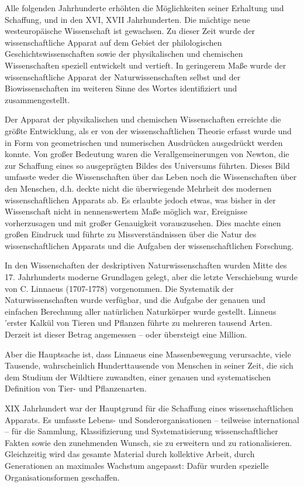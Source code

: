 \documentclass[11pt,a4paper]{book}
\begin{document}
Alle folgenden Jahrhunderte erhöhten die Möglichkeiten seiner Erhaltung und Schaffung, und in den XVI, XVII Jahrhunderten. Die mächtige neue westeuropäische Wissenschaft ist gewachsen. Zu dieser Zeit wurde der wissenschaftliche Apparat auf dem Gebiet der philologischen Geschichtswissenschaften sowie der physikalischen und chemischen Wissenschaften speziell entwickelt und vertieft. In geringerem Maße wurde der wissenschaftliche Apparat der Naturwissenschaften selbst und der Biowissenschaften im weiteren Sinne des Wortes identifiziert und zusammengestellt.



Der Apparat der physikalischen und chemischen Wissenschaften erreichte die größte Entwicklung, als er von der wissenschaftlichen Theorie erfasst wurde und in Form von geometrischen und numerischen Ausdrücken ausgedrückt werden konnte. Von großer Bedeutung waren die Verallgemeinerungen von Newton, die zur Schaffung eines so ausgeprägten Bildes des Universums führten. Dieses Bild umfasste weder die Wissenschaften über das Leben noch die Wissenschaften über den Menschen, d.h. deckte nicht die überwiegende Mehrheit des modernen wissenschaftlichen Apparats ab. Es erlaubte jedoch etwas, was bisher in der Wissenschaft nicht in nennenswertem Maße möglich war, Ereignisse vorherzusagen und mit großer Genauigkeit vorauszusehen. Dies machte einen großen Eindruck und führte zu Missverständnissen über die Natur des wissenschaftlichen Apparats und die Aufgaben der wissenschaftlichen Forschung.



In den Wissenschaften der deskriptiven Naturwissenschaften wurden Mitte des 17. Jahrhunderts moderne Grundlagen gelegt, aber die letzte Verschiebung wurde von C. Linnaeus (1707-1778) vorgenommen. Die Systematik der Naturwissenschaften wurde verfügbar, und die Aufgabe der genauen und einfachen Berechnung aller natürlichen Naturkörper wurde gestellt. Linneus 'erster Kalkül von Tieren und Pflanzen führte zu mehreren tausend Arten. Derzeit ist dieser Betrag angemessen -- oder übersteigt eine Million.



Aber die Hauptsache ist, dass Linnaeus eine Massenbewegung verursachte, viele Tausende, wahrscheinlich Hunderttausende von Menschen in seiner Zeit, die sich dem Studium der Wildtiere zuwandten, einer genauen und systematischen Definition von Tier- und Pflanzenarten.



XIX Jahrhundert war der Hauptgrund für die Schaffung eines wissenschaftlichen Apparats. Es umfasste Lebens- und Sonderorganisationen -- teilweise international -- für die Sammlung, Klassifizierung und Systematisierung wissenschaftlicher Fakten sowie den zunehmenden Wunsch, sie zu erweitern und zu rationalisieren. Gleichzeitig wird das gesamte Material durch kollektive Arbeit, durch Generationen an maximales Wachstum angepasst: Dafür wurden spezielle Organisationsformen geschaffen.
\end{document}
